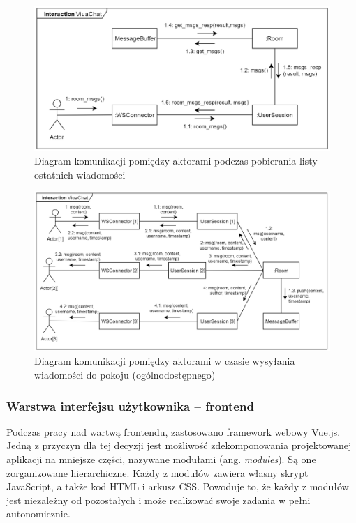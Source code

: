 \begin{figure}[!htp]
	\centering
	\includegraphics[width=\textwidth]{chat/fig/com-diag-room-msgs}
	\caption{Diagram komunikacji pomiędzy aktorami podczas pobierania listy
	ostatnich wiadomości}
	\label{com-diag-room-msgs}
\end{figure}

\begin{figure}[!htp]
	\centering
	\includegraphics[width=\textwidth]{chat/fig/com-diag-msg}
	\caption{Diagram komunikacji pomiędzy aktorami w czasie wysyłania wiadomości
	do pokoju (ogólnodostępnego)}
	\label{com-diag-msg}
\end{figure}


\newpage

\subsubsection{Warstwa interfejsu użytkownika -- frontend}
Podczas pracy nad wartwą frontendu, zastosowano framework webowy Vue.js. Jedną
z przyczyn dla tej decyzji jest możliwość zdekomponowania projektowanej aplikacji na mniejsze części, nazywane modułami (ang. \textit{modules}). Są one zorganizowane hierarchiczne. Każdy z modułów zawiera własny skrypt JavaScript, a także kod HTML i arkusz CSS. Powoduje to, że każdy z modułów jest niezależny od pozostałych i może realizować swoje zadania w pełni autonomicznie.

